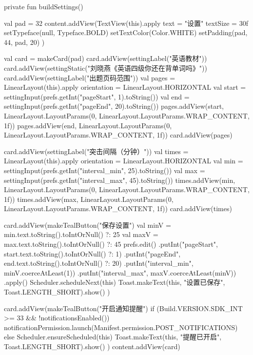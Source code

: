 {    private fun buildSettings() {
        val pad = 32
        content.addView(TextView(this).apply {
            text = "设置"
            textSize = 30f
            setTypeface(null, Typeface.BOLD)
            setTextColor(Color.WHITE)
            setPadding(pad, 44, pad, 20)
        })

        val card = makeCard(pad)
        card.addView(settingLabel("英语教材"))
        card.addView(settingStatic("刘晓燕《英语四级你还在背单词吗》"))
        card.addView(settingLabel("出题页码范围"))
        val pages = LinearLayout(this).apply { orientation = LinearLayout.HORIZONTAL }
        val start = settingInput(prefs.getInt("pageStart", 1).toString())
        val end = settingInput(prefs.getInt("pageEnd", 20).toString())
        pages.addView(start, LinearLayout.LayoutParams(0, LinearLayout.LayoutParams.WRAP_CONTENT, 1f))
        pages.addView(end, LinearLayout.LayoutParams(0, LinearLayout.LayoutParams.WRAP_CONTENT, 1f))
        card.addView(pages)

        card.addView(settingLabel("突击间隔（分钟）"))
        val times = LinearLayout(this).apply { orientation = LinearLayout.HORIZONTAL }
        val min = settingInput(prefs.getInt("interval_min", 25).toString())
        val max = settingInput(prefs.getInt("interval_max", 45).toString())
        times.addView(min, LinearLayout.LayoutParams(0, LinearLayout.LayoutParams.WRAP_CONTENT, 1f))
        times.addView(max, LinearLayout.LayoutParams(0, LinearLayout.LayoutParams.WRAP_CONTENT, 1f))
        card.addView(times)

        card.addView(makeTealButton("保存设置") {
            val minV = min.text.toString().toIntOrNull() ?: 25
            val maxV = max.text.toString().toIntOrNull() ?: 45
            prefs.edit()
                .putInt("pageStart", start.text.toString().toIntOrNull() ?: 1)
                .putInt("pageEnd", end.text.toString().toIntOrNull() ?: 20)
                .putInt("interval_min", minV.coerceAtLeast(1))
                .putInt("interval_max", maxV.coerceAtLeast(minV))
                .apply()
            Scheduler.scheduleNext(this)
            Toast.makeText(this, "设置已保存", Toast.LENGTH_SHORT).show()
        })

        card.addView(makeTealButton("开启通知提醒") {
            if (Build.VERSION.SDK_INT >= 33 && !notificationsEnabled()) {
                notificationPermission.launch(Manifest.permission.POST_NOTIFICATIONS)
            } else {
                Scheduler.ensureScheduled(this)
                Toast.makeText(this, "提醒已开启", Toast.LENGTH_SHORT).show()
            }
        })
        content.addView(card)
    }

}
